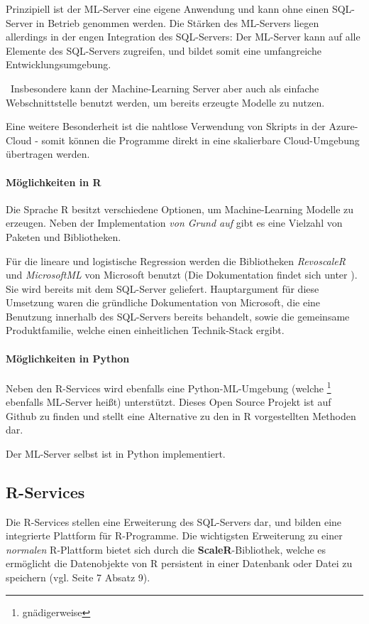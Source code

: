 Prinzipiell ist der ML-Server eine eigene Anwendung und kann ohne einen SQL-Server in Betrieb genommen werden. Die Stärken des ML-Servers liegen allerdings in der engen Integration des SQL-Servers: Der ML-Server kann auf alle Elemente des SQL-Servers zugreifen, und bildet somit eine umfangreiche Entwicklungsumgebung.

~\newline Insbesondere kann der Machine-Learning Server aber auch als einfache Webschnittstelle benutzt werden, um bereits erzeugte Modelle zu nutzen.

Eine weitere Besonderheit ist die nahtlose Verwendung von Skripts in der Azure-Cloud - somit können die Programme direkt in eine skalierbare Cloud-Umgebung übertragen werden. 
\paragraph{Möglichkeiten in  R}
Die Sprache R besitzt verschiedene Optionen, um Machine-Learning Modelle zu erzeugen. Neben der Implementation \textit{von Grund auf} gibt es eine Vielzahl von Paketen und Bibliotheken. 

Für die lineare und logistische Regression werden die Bibliotheken \textit{RevoscaleR} und \textit{MicrosoftML} von Microsoft benutzt (Die Dokumentation findet sich unter \cite{RevoscaleR}). Sie wird bereits mit dem SQL-Server geliefert. Hauptargument für diese Umsetzung waren die gründliche Dokumentation von Microsoft, die eine Benutzung innerhalb des SQL-Servers bereits behandelt, sowie die gemeinsame Produktfamilie, welche einen einheitlichen Technik-Stack ergibt. 
\paragraph{Möglichkeiten in Python}
Neben den R-Services wird ebenfalls eine Python-ML-Umgebung (welche \footnote{gnädigerweise} ebenfalls ML-Server heißt) unterstützt. Dieses Open Source Projekt ist auf Github \cite{GithubMLServer} zu finden und stellt eine Alternative zu den in R vorgestellten Methoden dar. 

Der ML-Server selbst ist in Python implementiert.

\subsection{R-Services}
Die R-Services stellen eine Erweiterung des SQL-Servers dar, und bilden eine integrierte Plattform für R-Programme. Die wichtigsten Erweiterung zu einer \textit{normalen} R-Plattform bietet sich durch die \textbf{ScaleR}-Bibliothek, welche es ermöglicht die Datenobjekte von R persistent in einer Datenbank oder Datei zu speichern (vgl. \cite{SQLData} Seite 7 Absatz 9). 

